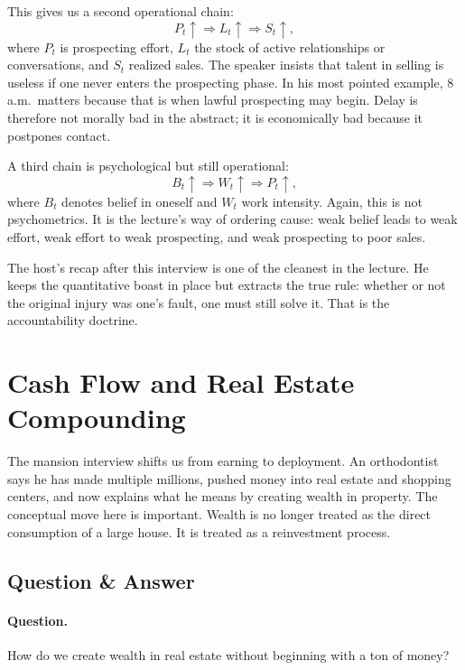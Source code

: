 This gives us a second operational chain:
\begin{equation}
P_t \uparrow \Rightarrow L_t \uparrow \Rightarrow S_t \uparrow,
\end{equation}
where \(P_t\) is prospecting effort, \(L_t\) the stock of active relationships or conversations, and \(S_t\) realized sales. The speaker insists that talent in selling is useless if one never enters the prospecting phase. In his most pointed example, 8 a.m.\ matters because that is when lawful prospecting may begin. Delay is therefore not morally bad in the abstract; it is economically bad because it postpones contact.

A third chain is psychological but still operational:
\begin{equation}
B_t \uparrow \Rightarrow W_t \uparrow \Rightarrow P_t \uparrow,
\end{equation}
where \(B_t\) denotes belief in oneself and \(W_t\) work intensity. Again, this is not psychometrics. It is the lecture's way of ordering cause: weak belief leads to weak effort, weak effort to weak prospecting, and weak prospecting to poor sales.

The host's recap after this interview is one of the cleanest in the lecture. He keeps the quantitative boast in place but extracts the true rule: whether or not the original injury was one's fault, one must still solve it. That is the accountability doctrine.

\section{Cash Flow and Real Estate Compounding}

The mansion interview shifts us from earning to deployment. An orthodontist says he has made multiple millions, pushed money into real estate and shopping centers, and now explains what he means by creating wealth in property. The conceptual move here is important. Wealth is no longer treated as the direct consumption of a large house. It is treated as a reinvestment process.

\subsection{Question \& Answer}

\paragraph{Question.} How do we create wealth in real estate without beginning with a ton of money?

